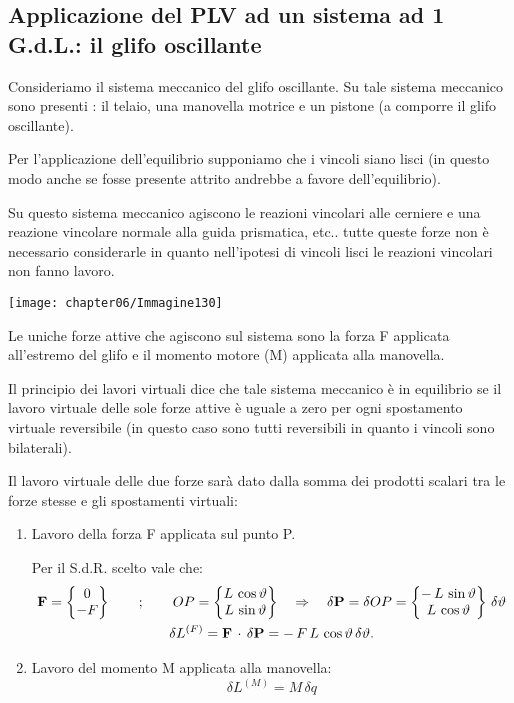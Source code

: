 \subsection{Applicazione del PLV ad un sistema ad 1 G.d.L.: il glifo oscillante}

	Consideriamo il sistema meccanico del glifo oscillante. Su tale sistema meccanico sono presenti : il telaio, una manovella motrice e un pistone (a comporre il glifo oscillante).
	
	Per l'applicazione dell'equilibrio supponiamo che i vincoli siano lisci (in questo modo anche se fosse presente attrito andrebbe a favore dell'equilibrio).
	
	Su questo sistema meccanico agiscono le reazioni vincolari alle cerniere e una reazione vincolare normale alla guida prismatica, etc.. tutte queste forze non è necessario considerarle in quanto nell'ipotesi di vincoli lisci le reazioni vincolari non fanno lavoro.
	
	\begin{minipage}{.4\textwidth}
	\centering
	\texttt{[image: chapter06/Immagine130]}
	\end{minipage}
	\hfill
	\begin{minipage}{.5\textwidth}	
	Le uniche forze attive che agiscono sul sistema sono la forza F applicata all'estremo del glifo e il momento motore (M) applicata alla manovella.
	
	Il principio dei lavori virtuali dice che tale sistema meccanico è in equilibrio se il lavoro virtuale delle sole forze attive è uguale a zero per ogni spostamento virtuale reversibile (in questo caso sono tutti reversibili in quanto i vincoli sono bilaterali).
	\end{minipage}
	
	Il lavoro virtuale delle due forze sarà dato dalla somma dei prodotti scalari tra le forze stesse e gli spostamenti virtuali:
	
	\begin{enumerate}[$\rightarrow$]
	\item Lavoro della forza F applicata sul punto P.
	
	Per il S.d.R. scelto vale che:
	\begin{gather*}
	\mathbf{F} = \begin{Bmatrix}0\\-F\end{Bmatrix}\qquad;\qquad OP = \begin{Bmatrix}L\,\cos{\vartheta}\\L\,\sin{\vartheta}\end{Bmatrix}\quad\Rightarrow\quad\delta \mathbf{P} = \delta OP = \begin{Bmatrix}-\,L\,\sin{\vartheta}\\L\,\cos{\vartheta}\end{Bmatrix}\,\delta \vartheta\\
	\delta L^{(F)} = \mathbf{F}\,\cdot\,\mathbf{\delta P} = -\,F\,L\,\cos{\vartheta}\,\delta \vartheta.
	\end{gather*}
	\item Lavoro del momento M applicata alla manovella:
	\[\delta L ^{(M)} = M\,\delta q\]
	\end{enumerate}

